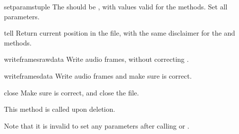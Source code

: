 \begin{methoddesc}[AU_write]{setparams}{tuple}
The  should be , with
values valid for the  methods.  Set all parameters.
\end{methoddesc}

\begin{methoddesc}[AU_write]{tell}{}
Return current position in the file, with the same disclaimer for
the  and  methods.
\end{methoddesc}

\begin{methoddesc}[AU_write]{writeframesraw}{data}
Write audio frames, without correcting .
\end{methoddesc}

\begin{methoddesc}[AU_write]{writeframes}{data}
Write audio frames and make sure  is correct.
\end{methoddesc}

\begin{methoddesc}[AU_write]{close}{}
Make sure  is correct, and close the file.

This method is called upon deletion.
\end{methoddesc}

Note that it is invalid to set any parameters after calling 
 or . 
